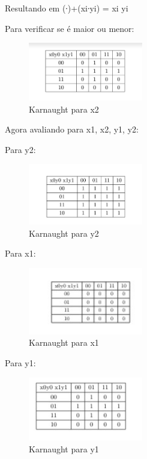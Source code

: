 \documentclass{article}
\begin{document}
Resultando em (∙)+(xi∙yi) = xi \oplus yi

Para verificar se é maior ou menor:

\begin{figure}[!h]
\centering
\includegraphics[width=5cm]{fig06.png}
\caption{Karnaught para x2}
\label{fig:CL_logo}
\end{figure}

Agora avaliando para x1, x2, y1, y2:

Para y2:
\begin{figure}[!h]
\centering
\includegraphics[width=5cm]{fig07.png}
\caption{Karnaught para y2}
\label{fig:CL_logo}
\end{figure}

Para x1:

\begin{figure}[!h]
\centering
\includegraphics[width=5cm]{x1.jpeg}
\caption{Karnaught para x1}
\label{fig:CL_logo}
\end{figure}

Para y1:

\begin{figure}[!h]
\centering
\includegraphics[width=5cm]{y1.jpeg}
\caption{Karnaught para y1}
\label{fig:CL_logo}
\end{figure}
\end{document}
